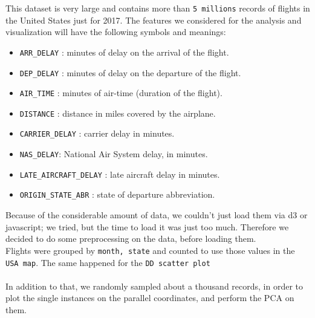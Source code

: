 \documentclass[a4paper, 12pt]{article}
\begin{document}
This dataset is very large and contains more than \texttt{5 millions} records of flights in the United
States just for 2017. 
The features we considered for the analysis and visualization will have the following symbols and
meanings:
\begin{itemize}
	\item \texttt{ARR\_DELAY} : minutes of delay on the arrival of the flight.
	\item \texttt{DEP\_DELAY} : minutes of delay on the departure of the flight.
	\item \texttt{AIR\_TIME} : minutes of air-time (duration of the flight).
\item \texttt{DISTANCE} : distance in miles covered by the airplane.
\item \texttt{CARRIER\_DELAY} : carrier delay in minutes.
\item \texttt{NAS\_DELAY}: National Air System delay, in minutes.
\item \texttt{LATE\_AIRCRAFT\_DELAY} : late aircraft delay in minutes.
\item \texttt{ORIGIN\_STATE\_ABR} : state of departure abbreviation.
\end{itemize}
Because of the considerable amount of data, we couldn't just load them via d3 or javascript; 
we tried, but the time to load it was just too much. Therefore we decided to do some preprocessing on
the data, before loading them.\\
Flights were grouped by \texttt{month, state} and counted to use those values in the \texttt{USA map}.
The same happened for the \texttt{DD scatter plot}\\ \\
In addition to that, we randomly sampled about a thousand records, in order to plot the single instances
on the parallel coordinates, and perform the PCA on them.
\end{document}
